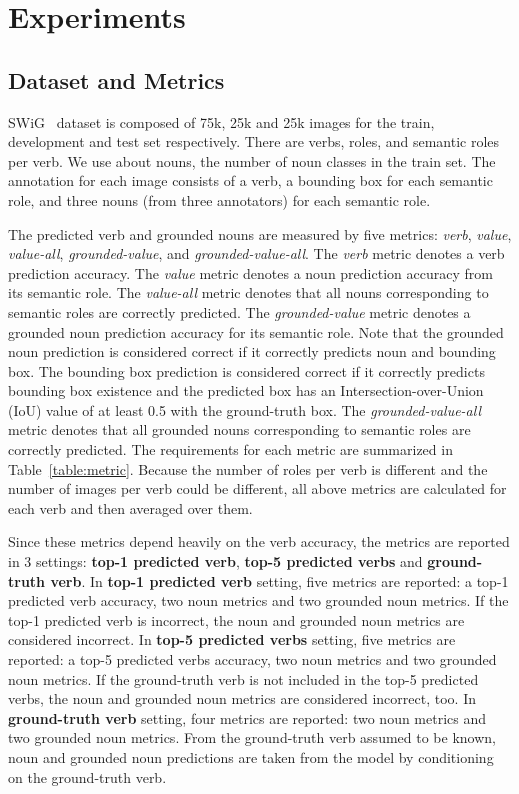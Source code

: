 \section{Experiments}

\subsection{Dataset and Metrics}
\label{exp:data}
SWiG~\cite{pratt2020grounded} dataset is composed of 75k, 25k and 25k images for the train, development and test set respectively.
There are  verbs,  roles, and  semantic roles per verb.
We use about  nouns, the number of noun classes in the train set.
The annotation for each image consists of a verb, a bounding box for each semantic role, and three nouns (from three annotators) for each semantic role.

The predicted verb and grounded nouns are measured by five metrics: \textit{verb}, \textit{value}, \textit{value-all}, \textit{grounded-value}, and \textit{grounded-value-all}.
The \textit{verb} metric denotes a verb prediction accuracy.
The \textit{value} metric denotes a noun prediction accuracy from its semantic role.
The \textit{value-all} metric denotes that all nouns corresponding to semantic roles are correctly predicted.
The \textit{grounded-value} metric denotes a grounded noun prediction accuracy for its semantic role.
Note that the grounded noun prediction is considered correct if it correctly predicts noun and bounding box.
The bounding box prediction is considered correct if it correctly predicts bounding box existence and the predicted box has an Intersection-over-Union (IoU) value of at least 0.5 with the ground-truth box.
The \textit{grounded-value-all} metric denotes that all grounded nouns corresponding to semantic roles are correctly predicted. 
The requirements for each metric are summarized in Table~\ref{table:metric}.
Because the number of roles per verb is different and the number of images per verb could be different, all above metrics are calculated for each verb and then averaged over them. 

Since these metrics depend heavily on the verb accuracy, the metrics are reported in 3 settings: \textbf{top-1 predicted verb}, \textbf{top-5 predicted verbs} and \textbf{ground-truth verb}.
In \textbf{top-1 predicted verb} setting, five metrics are reported: a top-1 predicted verb accuracy, two noun metrics and two grounded noun metrics.
If the top-1 predicted verb is incorrect, the noun and grounded noun metrics are considered incorrect.
In \textbf{top-5 predicted verbs} setting, five metrics are reported: a top-5 predicted verbs accuracy, two noun metrics and two grounded noun metrics.
If the ground-truth verb is not included in the top-5 predicted verbs, the noun and grounded noun metrics are
considered incorrect, too.
In \textbf{ground-truth verb} setting, four metrics are reported: two noun metrics and two grounded noun metrics.
From the ground-truth verb assumed to be known, noun and grounded noun predictions are taken from the model by conditioning on the ground-truth verb.

